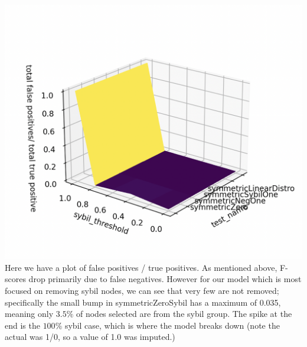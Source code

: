 \documentclass{article}
\begin{document}
\includegraphics[width=\textwidth, height=\textwidth]{false-pos-vs-true-pos}
Here we have a plot of false positives / true positives. As mentioned above, F-scores drop primarily due to false negatives. However for our model which is most focused on removing sybil nodes, we can see that very few are not removed; specifically the small bump in symmetricZeroSybil has a maximum of 0.035, meaning only $3.5\%$ of nodes selected are from the sybil group. The spike at the end is the $100\%$ sybil case, which is where the model breaks down (note the actual was 1/0, so a value of 1.0 was imputed.)
\end{document}
